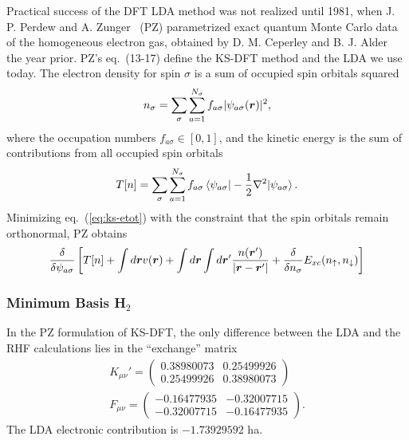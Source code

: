 Practical success of the DFT LDA method was not realized until 1981, when J. P. Perdew and A. Zunger~\cite{Perdew1981} (PZ) parametrized exact quantum Monte Carlo data of the homogeneous electron gas, obtained by D. M. Ceperley and B. J. Alder~\cite{Ceperley1980} the year prior. PZ's eq.~(13-17) define the KS-DFT method and the LDA we use today. The electron density for spin $\sigma$ is a sum of occupied spin orbitals squared
\begin{align}
n_{\sigma} = \sum\limits_{\sigma}\sum\limits_{a=1}^{N_{\sigma}}
f_{a\sigma} \vert\psi_{a\sigma}(\boldsymbol{r})\vert^2,
\end{align}
where the occupation numbers $f_{a\sigma}\in[0, 1]$, and the kinetic energy is the sum of contributions from all occupied spin orbitals
\begin{align}
T[n] = \sum\limits_\sigma\sum\limits_{a=1}^{N_{\sigma}}
f_{a\sigma} \braket{\psi_{a\sigma}|-\frac{1}{2}\nabla^2|\psi_{a\sigma}}.
\end{align}
Minimizing eq.~(\ref{eq:ks-etot}) with the constraint that the spin orbitals remain orthonormal, PZ obtains
\begin{align}
\dfrac{\delta}{\delta\psi_{a\sigma}} \left[
T[n] + \int d\boldsymbol{r}v(\boldsymbol{r}) + \int d\boldsymbol{r}\int d\boldsymbol{r}' \dfrac{n(\boldsymbol{r}')}{\vert\boldsymbol{r}-\boldsymbol{r}'\vert} +
\dfrac{\delta}{\delta n_{\sigma}} E_{xc}(n_{\uparrow},n_{\downarrow})
\right]
\end{align}

\subsubsection{Minimum Basis H$_2$}
In the PZ formulation of KS-DFT, the only difference between the LDA and the RHF calculations lies in the ``exchange'' matrix
\begin{align}
K_{\mu\nu}' = \left(\begin{array}{cc}
0.38980073 & 0.25499926 \\
0.25499926 & 0.38980073
\end{array}\right)\\
F_{\mu\nu} = \left(\begin{array}{cc}
-0.16477935 & -0.32007715 \\
-0.32007715 & -0.16477935
\end{array}\right).\label{eq:h2-lda-fock-r14}
\end{align}
The LDA electronic contribution is $-1.73929592$ ha.

